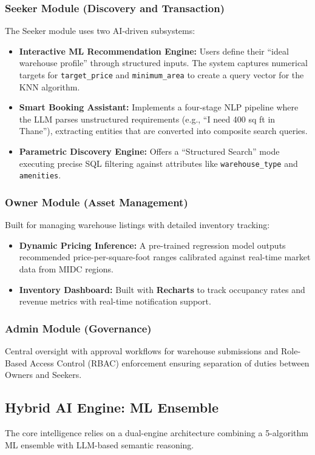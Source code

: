 \documentclass[conference]{IEEEtran}
\begin{document}
\subsubsection{Seeker Module (Discovery and Transaction)}
The Seeker module uses two AI-driven subsystems:
\begin{itemize}
    \item \textbf{Interactive ML Recommendation Engine:} Users define their ``ideal warehouse profile'' through structured inputs. The system captures numerical targets for \texttt{target\_price} and \texttt{minimum\_area} to create a query vector for the KNN algorithm.
    \item \textbf{Smart Booking Assistant:} Implements a four-stage NLP pipeline where the LLM parses unstructured requirements (e.g., ``I need 400 sq ft in Thane''), extracting entities that are converted into composite search queries.
    \item \textbf{Parametric Discovery Engine:} Offers a ``Structured Search'' mode executing precise SQL filtering against attributes like \texttt{warehouse\_type} and \texttt{amenities}.
\end{itemize}

\subsubsection{Owner Module (Asset Management)}
Built for managing warehouse listings with detailed inventory tracking:
\begin{itemize}
    \item \textbf{Dynamic Pricing Inference:} A pre-trained regression model outputs recommended price-per-square-foot ranges calibrated against real-time market data from MIDC regions.
    \item \textbf{Inventory Dashboard:} Built with \textbf{Recharts} to track occupancy rates and revenue metrics with real-time notification support.
\end{itemize}

\subsubsection{Admin Module (Governance)}
Central oversight with approval workflows for warehouse submissions and Role-Based Access Control (RBAC) enforcement ensuring separation of duties between Owners and Seekers.

\subsection{Hybrid AI Engine: ML Ensemble}
The core intelligence relies on a dual-engine architecture combining a 5-algorithm ML ensemble with LLM-based semantic reasoning.
\end{document}
